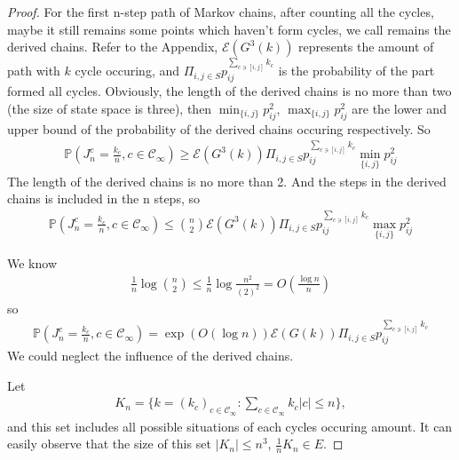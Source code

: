 \documentclass[11pt,en,cite=authoryear]{elegantpaper}
\begin{document}
\begin{proof}
    For the first n-step path of Markov chains, after counting all the cycles, maybe it still remains some points which haven't form cycles, we call remains the derived chains.
    Refer to the Appendix, $\mathcal{E} (G^3(k))$ represents the amount of path with $k$ cycle occuring, and $\Pi_{i,j \in S} p_{ij}^{\sum_{c \ni [i,j]} k_{c}} $ is the probability of the part formed all cycles. Obviously, the length of the derived chains is no more than two (the size of state space is three), then
    $\min_{\{i, j\}} p_{ij}^{2}$, $\max_{\{i, j\}} p_{ij}^2$ are the lower and upper bound of the probability of the derived chains occuring respectively. So
    \begin{align*}
        \mathbb{P}(J_{n}^c= \frac{k_c}{n}, c \in \mathcal{C}_{\infty}) 
        \ge \mathcal{E} (G^3(k)) \Pi_{i,j \in S} p_{ij}^{\sum_{c \ni [i,j]} k_{c}}
        \min_{\{i, j\}} p_{ij}^{2}
    \end{align*}
    The length of the derived chains is no more than 2. And the steps in the derived chains is included in the n steps, so
    \begin{align*}
        \mathbb{P}(J_{n}^c = \frac{k_c}{n}, c \in \mathcal{C}_{\infty}) 
        \le \binom{n}{2}
        \mathcal{E} (G^3(k)) \Pi_{i,j \in S} p_{ij}^{\sum_{c \ni [i,j]} k_{c}}
        \max_{\{i, j\}} p_{ij}^2
    \end{align*}

    We know
    \begin{align*}
        \frac{1}{n} \log \binom{n}{2} \le \frac{1}{n} \log \frac{n^2}{(2)^{2}}
        = O(\frac{\log n}{n})
    \end{align*}
    so 
    \begin{align*}
        \mathbb{P}(J_{n}^c = \frac{k_c}{n}, c \in \mathcal{C}_{\infty}) 
        = \exp(O (\log n))
        \mathcal{E} (G(k)) \Pi_{i,j \in S} p_{ij}^{\sum_{c \ni [i,j]} k_{c}}
    \end{align*}
    We could neglect the influence of the derived chains.

    Let
    \begin{align*}
        K_n = \biggl\{k=(k_c)_{c\in \mathcal{C}_{\infty}}: \sum_{c \in \mathcal{C}_{\infty}} k_{c} |c| \le n \biggr\},
    \end{align*}
    and this set includes all possible situations of each cycles occuring amount. It can easily observe that the size of this set $|K_n| \le n^3$, $\frac{1}{n} K_n \in E$. 


\end{proof}
\end{document}
